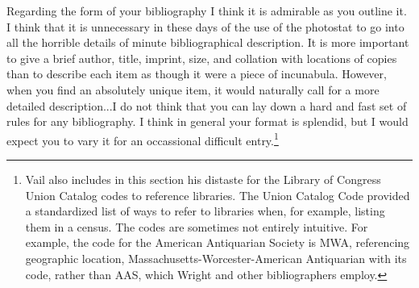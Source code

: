 \begin{displayquote}
Regarding the form of your bibliography I think it is admirable as you outline it. I think that it is unnecessary in these days of the use of the photostat to go into all the horrible details of minute bibliographical description. It is more important to give a brief author, title, imprint, size, and collation with locations of copies than to describe each item as though it were a piece of incunabula. However, when you find an absolutely unique item, it would naturally call for a more detailed description...I do not think that you can lay down a hard and fast set of rules for any bibliography. I think in general your format is splendid, but I would expect you to vary it for an occassional difficult entry.\footnote{\autocite{robert_g._vail_letter_1936-1} Vail also includes in this section his distaste for the Library of Congress Union Catalog codes to reference libraries. The Union Catalog Code provided a standardized list of ways to refer to libraries when, for example, listing them in a census. The codes are sometimes not entirely intuitive. For example, the code for the American Antiquarian Society is MWA, referencing geographic location, Massachusetts-Worcester-American Antiquarian with its code, rather than AAS, which Wright and other bibliographers employ.} 
\end{displayquote}

